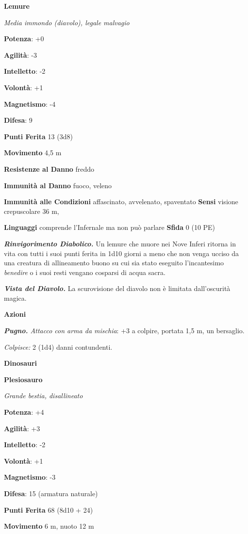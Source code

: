 \begin{multicols}{2}
\textbf{Lemure}

\emph{Media immondo (diavolo), legale malvagio}

\textbf{Potenza}: +0

\textbf{Agilità}: -3

\textbf{Intelletto}: -2

\textbf{Volontà}: +1

\textbf{Magnetismo}: -4

\textbf{Difesa}: 9

\textbf{Punti Ferita} 13 (3d8)

\textbf{Movimento} 4,5 m

\textbf{Resistenze al Danno} freddo

\textbf{Immunità al Danno} fuoco, veleno

\textbf{Immunità alle Condizioni} affascinato, avvelenato, spaventato
\textbf{Sensi} visione crepuscolare 36 m, 

\textbf{Linguaggi} comprende l'Infernale ma non può parlare
\textbf{Sfida} 0 (10 PE)

\emph{\textbf{Rinvigorimento Diabolico.}} Un lemure che muore nei Nove
Inferi ritorna in vita con tutti i suoi punti ferita in 1d10 giorni a
meno che non venga ucciso da una creatura di allineamento buono su cui
sia stato eseguito l'incantesimo \emph{benedire} o i suoi resti vengano
cosparsi di acqua sacra.

\emph{\textbf{Vista del Diavolo.}} La scurovisione del diavolo non è
limitata dall'oscurità magica.

\textbf{Azioni}

\emph{\textbf{Pugno.} Attacco con arma da mischia}: +3 a colpire,
portata 1,5 m, un bersaglio.

\emph{Colpisce:} 2 (1d4) danni contundenti.

\textbf{Dinosauri}

\textbf{Plesiosauro}

\emph{Grande bestia, disallineato}

\textbf{Potenza}: +4

\textbf{Agilità}: +3

\textbf{Intelletto}: -2

\textbf{Volontà}: +1

\textbf{Magnetismo}: -3

\textbf{Difesa}: 15 (armatura naturale)

\textbf{Punti Ferita} 68 (8d10 + 24)

\textbf{Movimento} 6 m, nuoto 12 m


\end{multicols}
